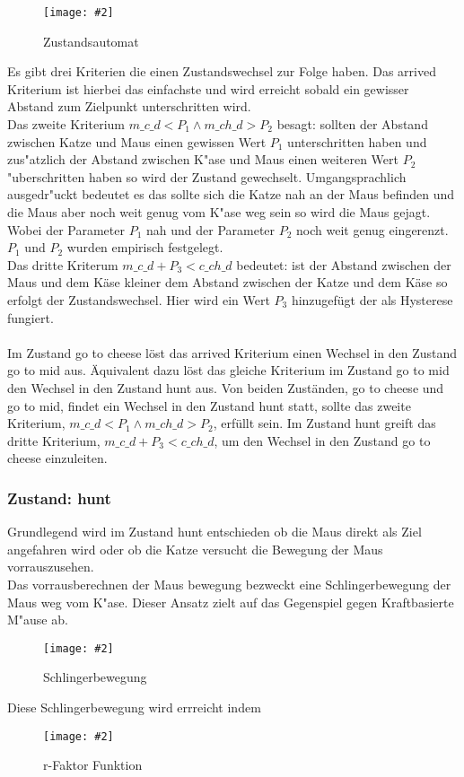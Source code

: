 \documentclass[
a4paper,     %
12pt         %
]{scrartcl}  %
\newcommand{\mygraphics}[3]{
\begin{figure}[!h]
  \begin{center}
    \texttt{[image: \#2]} \\    
    \caption{#3}\label{fig:#2}
  \end{center}
\end{figure}

}
\begin{document}
\mygraphics{0.7\textwidth}{stateMachine.png}{Zustandsautomat}
Es gibt drei Kriterien die einen Zustandswechsel zur Folge haben. Das \glqq arrived\grqq{} Kriterium ist hierbei das einfachste und wird erreicht sobald ein gewisser Abstand zum Zielpunkt unterschritten wird.\\
Das zweite Kriterium \glqq$m\_c\_d < P_{1} \land  m\_ch\_d > P_{2} $\grqq{} besagt: sollten der Abstand zwischen Katze und Maus einen gewissen Wert $P_{1}$ unterschritten haben und zus"atzlich der Abstand zwischen K"ase und Maus einen weiteren Wert $P_{2}$ "uberschritten haben so wird der Zustand gewechselt. Umgangsprachlich ausgedr"uckt bedeutet es das sollte sich die Katze nah an der Maus befinden und die Maus aber noch weit genug vom K"ase weg sein so wird die Maus gejagt. Wobei der Parameter $P_{1}$ \glqq nah \grqq{} und der Parameter $P_{2}$ \glqq noch weit genug\grqq{} eingerenzt. $P_{1}$ und $P_{2}$ wurden empirisch festgelegt.\\
Das dritte Kriterum \glqq $m\_c\_d + P_{3} < c\_ch\_d$\grqq{} bedeutet: ist der Abstand zwischen der Maus und dem Käse kleiner dem Abstand zwischen der Katze und dem Käse so erfolgt der Zustandswechsel. Hier wird ein Wert $P_{3}$ hinzugefügt der als Hysterese fungiert.
\\\\Im Zustand \glqq go to cheese\grqq{} löst das \glqq arrived\grqq{} Kriterium einen Wechsel in den Zustand \glqq go to mid\grqq{}
aus. Äquivalent dazu löst das gleiche Kriterium im Zustand \glqq go to mid\grqq{} den Wechsel in den Zustand \glqq hunt\grqq{} aus.
Von beiden Zuständen, \glqq go to cheese\grqq{} und \glqq go to mid\grqq{}, findet ein Wechsel in den Zustand \glqq hunt\grqq{} statt, sollte das zweite Kriterium, \glqq$m\_c\_d < P_{1} \land  m\_ch\_d > P_{2} $\grqq{}, erfüllt sein. Im Zustand \glqq hunt\grqq{} greift das dritte Kriterium, \glqq $m\_c\_d + P_{3} < c\_ch\_d$\grqq{}, um den Wechsel in den Zustand \glqq go to cheese\grqq{} einzuleiten.
\clearpage
\subsubsection{Zustand: \glqq hunt\grqq{}}
\label{hunt}
Grundlegend wird im Zustand \glqq hunt\grqq{} entschieden ob die Maus direkt als Ziel angefahren wird oder ob die Katze versucht die Bewegung der Maus vorrauszusehen.\\
Das vorrausberechnen der Maus bewegung bezweckt eine Schlingerbewegung der Maus weg vom K"ase. Dieser Ansatz zielt auf das Gegenspiel gegen Kraftbasierte M"ause ab.
\mygraphics{0.6\textwidth}{ziel.png}{Schlingerbewegung}
Diese Schlingerbewegung wird errreicht indem 
\mygraphics{0.9\textwidth}{huntFunction.png}{r-Faktor Funktion}
\clearpage
\end{document}

